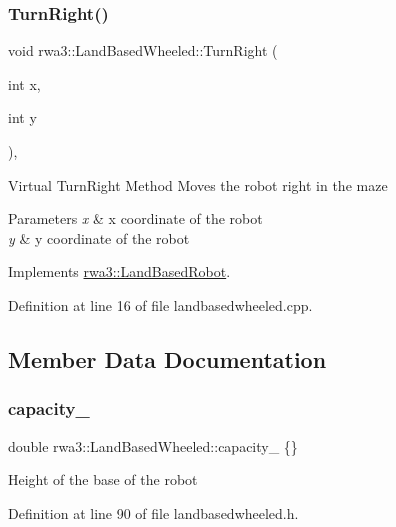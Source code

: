 \subsubsection{\texorpdfstring{Turn\+Right()}{TurnRight()}}
{\footnotesize\ttfamily void rwa3\+::\+Land\+Based\+Wheeled\+::\+Turn\+Right (\begin{DoxyParamCaption}\item[{int}]{x,  }\item[{int}]{y }\end{DoxyParamCaption})\hspace{0.3cm}{\ttfamily [override]}, {\ttfamily [virtual]}}

Virtual Turn\+Right Method Moves the robot right in the maze 
\begin{DoxyParams}{Parameters}
{\em x} & x coordinate of the robot \\
\hline
{\em y} & y coordinate of the robot \\
\hline
\end{DoxyParams}


Implements \hyperlink{classrwa3_1_1_land_based_robot_ab62f4e787ae7f04dd9374b4f7e84985c}{rwa3\+::\+Land\+Based\+Robot}.



Definition at line 16 of file landbasedwheeled.\+cpp.



\subsection{Member Data Documentation}
\mbox{\label{classrwa3_1_1_land_based_wheeled_ae4c27098e9bfc2ebc1d8c0e418949f7e}} 
\subsubsection{\texorpdfstring{capacity\+\_\+}{capacity\_}}
{\footnotesize\ttfamily double rwa3\+::\+Land\+Based\+Wheeled\+::capacity\+\_\+ \{\}\hspace{0.3cm}{\ttfamily [protected]}}

Height of the base of the robot 

Definition at line 90 of file landbasedwheeled.\+h.

\mbox{\label{classrwa3_1_1_land_based_wheeled_ac4ae319794a7dd4500160725ebb2b3a0}} 
